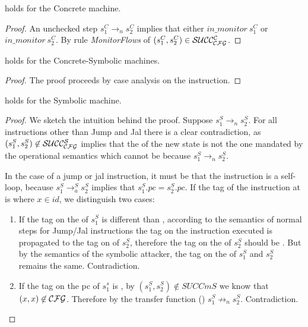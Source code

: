 \begin{lemma}
  \label{cfg_nocheck_CS}
   holds for the Concrete machine.
\end{lemma}
\begin{proof}
  An unchecked step $s^C_1 \to_n s^C_2$ implies
  that either $in\_monitor~s^C_1$ or $in\_monitor~s^C_2$.
  By rule \emph{MonitorFlows} of 
  $(s^C_1,s^C_2) \in \mathcal{SUCC_\mathcal{CFG}^{C}}$.
\end{proof}

\begin{lemma}
  \label{cfg_equiv_CS}
   holds for the Concrete-Symbolic machines.
\end{lemma}
\begin{proof}
  The proof proceeds by case analysis on the instruction. 
\end{proof}

\begin{lemma}
  \label{av_no_attacker_S}
   holds for the Symbolic machine.
\end{lemma}
\begin{proof}

  We sketch the intuition behind the proof.  Suppose $s^S_1 \to_n
  s^S_2$. For all instructions other than Jump and Jal there is a
  clear contradiction, as $(s^S_1,s^S_2) \not \in \mathcal{SUCC_\mathcal{CFG}^{S}}$ implies
  that the \pc of the new state is not the one mandated by the
  operational semantics which cannot be because $s^S_1 \to_n
  s^S_2$. 

  In the case of a jump or jal instruction, it must be that the
  instruction is a self-loop, because $s^S_1 \to^{S}_a s^S_2$
  implies that $s^S_1.pc = s^S_2.pc$.
  If the tag of the instruction at \pc is  where
  $x \in id$, we distinguish two cases:

  \begin{enumerate}
    \item If the tag on the \pc of $s^S_1$ is different than
      , according to the semantics of normal steps
      for Jump/Jal instructions the tag on the instruction executed
      is propagated to the tag on \pc of $s^S_2$, therefore the tag on
      the \pc of $s^S_2$ should be . But by
      the semantics of the symbolic attacker, the tag on the \pc
      of $s^S_1$ and $s^S_2$ remains the same. Contradiction.
    \item If the tag on the pc of $s^s_1$ is ,
      by $(s^S_1,s^S_2) \not \in SUCCm{S}$ we know that
      $(x,x) \not \in \mathcal{CFG}$. Therefore by the transfer
      function () $s^S_1 \not \to_n s^S_2$.
      Contradiction.
    \end{enumerate}
\end{proof}

